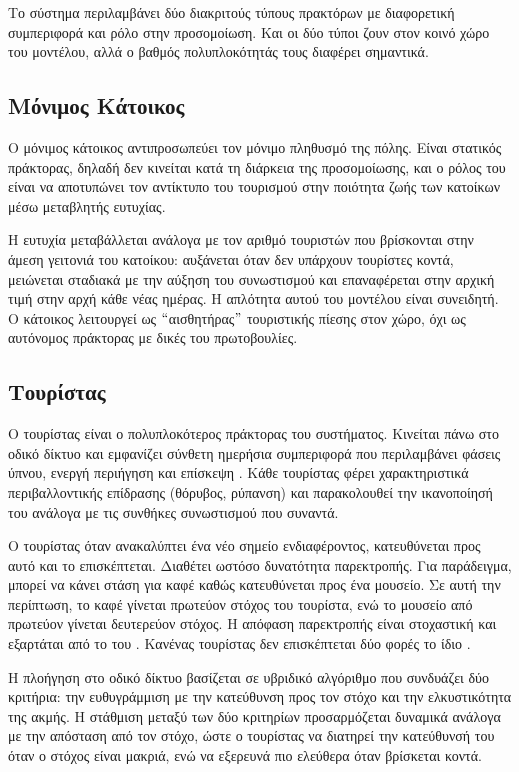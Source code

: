 Το σύστημα περιλαμβάνει δύο διακριτούς τύπους πρακτόρων με
διαφορετική συμπεριφορά και ρόλο στην προσομοίωση. Και οι δύο
τύποι ζουν στον κοινό χώρο του μοντέλου, αλλά ο βαθμός
πολυπλοκότητάς τους διαφέρει σημαντικά.

\subsection{Μόνιμος Κάτοικος}

Ο μόνιμος κάτοικος  αντιπροσωπεύει τον μόνιμο
πληθυσμό της πόλης. Είναι στατικός πράκτορας, δηλαδή δεν
κινείται κατά τη διάρκεια της προσομοίωσης, και ο ρόλος του
είναι να αποτυπώνει τον αντίκτυπο του τουρισμού στην ποιότητα
ζωής των κατοίκων μέσω μεταβλητής ευτυχίας.

Η ευτυχία  μεταβάλλεται ανάλογα με τον αριθμό
τουριστών που βρίσκονται στην άμεση γειτονιά του κατοίκου:
αυξάνεται όταν δεν υπάρχουν τουρίστες κοντά, μειώνεται
σταδιακά με την αύξηση του συνωστισμού και επαναφέρεται στην
αρχική τιμή στην αρχή κάθε νέας ημέρας. Η απλότητα αυτού του
μοντέλου είναι συνειδητή. Ο κάτοικος λειτουργεί ως
$``$αισθητήρας$"$ τουριστικής πίεσης στον χώρο, όχι ως
αυτόνομος πράκτορας με δικές του πρωτοβουλίες.

\subsection{Τουρίστας}

Ο τουρίστας  είναι ο πολυπλοκότερος πράκτορας
του συστήματος. Κινείται πάνω στο οδικό δίκτυο και εμφανίζει
σύνθετη ημερήσια συμπεριφορά που περιλαμβάνει φάσεις ύπνου,
ενεργή περιήγηση και επίσκεψη . Κάθε τουρίστας φέρει
χαρακτηριστικά περιβαλλοντικής επίδρασης (θόρυβος, ρύπανση)
και παρακολουθεί την ικανοποίησή του ανάλογα με τις συνθήκες
συνωστισμού που συναντά.

Ο τουρίστας όταν ανακαλύπτει ένα νέο σημείο ενδιαφέροντος,
κατευθύνεται προς αυτό και το επισκέπτεται. Διαθέτει ωστόσο
δυνατότητα παρεκτροπής. Για παράδειγμα, μπορεί να κάνει στάση
για καφέ καθώς κατευθύνεται προς ένα μουσείο. Σε αυτή την
περίπτωση, το καφέ γίνεται πρωτεύον στόχος του τουρίστα, ενώ
το μουσείο από πρωτεύον γίνεται δευτερεύον στόχος. Η απόφαση
παρεκτροπής είναι στοχαστική και εξαρτάται από το 
του . Κανένας τουρίστας δεν επισκέπτεται δύο φορές
το ίδιο .

Η πλοήγηση στο οδικό δίκτυο βασίζεται σε υβριδικό αλγόριθμο
που συνδυάζει δύο κριτήρια: την ευθυγράμμιση με την κατεύθυνση
προς τον στόχο και την ελκυστικότητα της ακμής. Η στάθμιση
μεταξύ των δύο κριτηρίων προσαρμόζεται δυναμικά ανάλογα με
την απόσταση από τον στόχο, ώστε ο τουρίστας να διατηρεί
την κατεύθυνσή του όταν ο στόχος είναι μακριά, ενώ να
εξερευνά πιο ελεύθερα όταν βρίσκεται κοντά.

